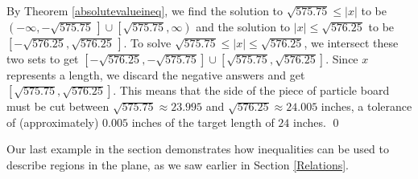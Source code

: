 \begin{ex}
By Theorem \ref{absolutevalueineq}, we find the solution to $\sqrt{575.75} \leq |x|$ to be $\left(-\infty, -\sqrt{575.75} \, \right] \cup \left[\sqrt{575.75}, \infty \right)$ and the solution to $|x| \leq \sqrt{576.25}$ to be  $\left[-\sqrt{576.25}, \sqrt{576.25} \, \right]$. To solve $\sqrt{575.75} \leq  |x|  \leq \sqrt{576.25}$, we intersect these two sets to get $[-\sqrt{576.25}, -\sqrt{575.75}] \cup [\sqrt{575.75},\sqrt{576.25}]$.  Since $x$ represents a length, we discard the negative answers and get $[\sqrt{575.75},\sqrt{576.25}]$.  This means that the side of the piece of particle board must be cut between $\sqrt{575.75} \approx 23.995$ and $\sqrt{576.25} \approx 24.005$ inches, a tolerance of (approximately) $0.005$ inches of the target length of $24$ inches. \qed

\end{ex}

Our last example in the section demonstrates how inequalities can be used to describe regions in the plane, as we saw earlier in Section \ref{Relations}.

